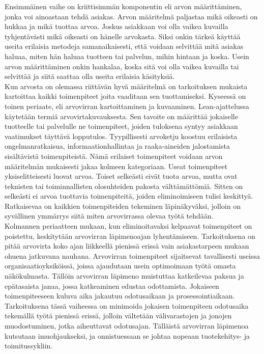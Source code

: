 \documentclass[finnish,12pt,a4paper,pdftex]{article}
\begin{document}
 Ensimmäinen vaihe on kriittisimmän komponentin eli arvon määrittäminen, jonka voi ainoastaan tehdä asiakas. Arvon määritelmä paljastaa mikä oikeasti on hukkaa ja mikä tuottaa arvoa. Joskus asiakkaan voi olla vaikea kuvailla tyhjentävästi mikä oikeasti on hänelle arvokasta. Siksi onkin tärkeä käyttää useita erilaisia metodeja samanaikaisesti, että voidaan selvittää mitä asiakas haluaa, miten hän haluaa tuotteen tai palvelun, mihin hintaan ja koska. Usein arvon määrittäminen onkin hankalaa, koska sitä voi olla vaikea kuvailla tai selvittää ja siitä saattaa olla useita erilaisia käsityksiä. \\

Kun arvosta on olemassa riittävän hyvä määritelmä on tarkoituksen mukaista kartoittaa kaikki toimenpiteet joita vaaditaan sen tuottamiseksi. Kyseessä on toinen periaate, eli arvovirran kartoittaminen ja kuvaaminen. Lean-ajattelussa käytetään termiä arvovirtakuvauksesta. Sen tavoite on määrittää jokaiselle tuotteelle tai palvelulle ne toimenpiteet, joiden tuloksena syntyy asiakkaan vaatimukset täyttävä lopputulos. Tyypillisesti arvoketju koostuu erilaisista ongelmanratkaisua, informaationhallintaa ja raaka-aineiden jalostamista sisältävistä toimenpiteistä. Nämä erilaiset toimenpiteet voidaan arvon määritelmän mukaisesti jakaa kolmeen kategoriaan. Useat toimenpiteet yksiselitteisesti luovat arvoa. Toiset selkeästi eivät tuota arvoa, mutta ovat teknisten tai toiminnallisten olosuhteiden pakosta välttämättömiä. Sitten on selkeästi ei arvoa tuottavia toimenpiteitä, joiden eliminoimiseen tulisi keskittyä. Ratkaisevaa on kaikkien toimenpiteiden tekeminen läpinäkyväksi, jolloin on syvällinen ymmärrys siitä miten arvovirrassa olevaa työtä tehdään.\\

Kolmannen periaatteen mukaan, kun eliminoitavaksi kelpaavat toimenpiteet on poistettu, keskitytään arvovirran läpimenoajan lyhentämiseen. Tarkoituksena on pitää arvovirta koko ajan liikkeellä pienissä erissä vain asiakastarpeen mukaan ohuena jatkuvana nauhana. Arvovirran toimenpiteet sijaitsevat tavallisesti useissa organisaatioyksiköissä, joissa ajaudutaan usein optimoimaan työtä omasta näkökulmasta. Tällöin arvovirran läpimeno muistuttaa katkeilevaa paksua ja epätasaista janaa, jossa katkeaminen edustaa odottamista. Jokaiseen toimenpiteeseen kuluva aika jakautuu odotusaikaan ja prosessointiaikaan. Tarkoituksena tässä vaiheessa on minimoida jokaisen toimenpiteen odotusaika tekemällä työtä pienissä erissä, jolloin vältetään välivarastojen ja jonojen muodostuminen, jotka aiheuttavat odotusajan. Tälläistä arvovirran läpimenoa kutsutaan imuohjaukseksi, ja onnistuessaan se johtaa nopeaan tuotekehitys- ja toimitussykliin.\\
\end{document}

